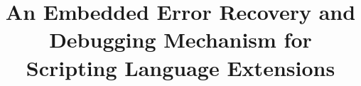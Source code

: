 
\setlength{\textheight}{9.0in}
\setlength{\columnsep}{0.25in}
\setlength{\textwidth}{6.45in}
\setlength{\footheight}{0.0in}
\setlength{\topmargin}{0.0in}
\setlength{\headheight}{0.0in}
\setlength{\headsep}{0.0in}
\setlength{\oddsidemargin}{0in}


\makeatletter
\def\@normalsize{\@setsize\normalsize{12pt}\xpt\@xpt
\abovedisplayskip 10pt plus2pt minus5pt\belowdisplayskip \abovedisplayskip
\abovedisplayshortskip \z@ plus3pt\belowdisplayshortskip 6pt plus3pt
minus3pt\let\@listi\@listI} 

\def\subsize{\@setsize\subsize{12pt}\xipt\@xipt}

\def\section{\@startsection {section}{1}{\z@}{24pt plus 2pt minus 2pt}
{12pt plus 2pt minus 2pt}{\large\bf}}

\def\subsection{\@startsection {subsection}{2}{\z@}{12pt plus 2pt minus 2pt}
{12pt plus 2pt minus 2pt}{\subsize\bf}}
\makeatother

\newcommand{\ignore}[1]{}



\date{}

\title{\Large \bf   An Embedded Error Recovery and Debugging Mechanism for Scripting Language Extensions}

